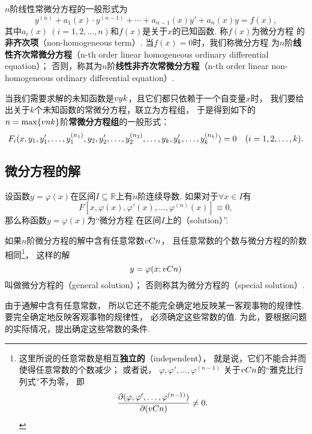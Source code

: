 \(n\)阶线性常微分方程的一般形式为
\begin{equation}\label{equation:微分方程.线性常微分方程的一般形式}
y^{(n)} + a_1(x) \cdot y^{(n-1)}
+ \dotsb + a_{n-1}(x) y'
+ a_n(x) y
= f(x),
\end{equation}
其中\(a_i(x)\ (i=1,2,\dotsc,n)\)和\(f(x)\)是关于\(x\)的已知函数.
称\(f(x)\)为微分方程  的\textbf{非齐次项}（non-homogeneous term）.
当\(f(x) = 0\)时，我们称微分方程  为\(n\)阶\textbf{线性齐次常微分方程}（n-th order linear homogeneous ordinary differential equation）；
否则，称其为\(n\)阶\textbf{线性非齐次常微分方程}（n-th order linear non-homogeneous ordinary differential equation）.

当我们需要求解的未知函数是\(v{y}{k}\)，且它们都只依赖于一个自变量\(x\)时，%
我们要给出关于\(k\)个未知函数的常微分方程，联立为方程组，%
于是得到如下的\(n = \max\{v{n}{k}\}\)阶\textbf{常微分方程组}的一般形式：
\[
\def\y#1{y_{#1},y_{#1}',\dotsc,y_{#1}^{(n_#1)}}%
F_i(x,\y{1},\y{2},\dotsc,\y{k})=0
\quad(i=1,2,\dotsc,k).
\]

\subsection{微分方程的解}
\begin{definition}
设函数\(y=\varphi(x)\)在区间\(I\subseteq\mathbb{R}\)上有\(n\)阶连续导数.
如果对于\(\forall x \in I\)有\[
F[x,\varphi(x),\varphi'(x),\dotsc,\varphi^{(n)}(x)]\equiv0,
\]那么称函数\(y=\varphi(x)\)为“微分方程  在区间\(I\)上的（solution）”.

如果\(n\)阶微分方程的解中含有任意常数\(v{C}{n}\)，%
且任意常数的个数与微分方程的阶数相同\footnote{%
这里所说的任意常数是相互\textbf{独立的}（independent），%
就是说，它们不能合并而使得任意常数的个数减少；%
或者说，%
\(\varphi,\varphi',\dotsc,\varphi^{(n-1)}\)%
关于\(v{C}{n}\)的“雅克比行列式”不为零，%
即\[
\pdv{ (\varphi,\varphi',\dotsc,\varphi^{(n-1)}) }{ (v{C}{n}) } \neq 0.
\]}，%
这样的解\[
y = \varphi(x;v{C}{n})
\]叫做微分方程的（general solution）；
否则称其为微分方程的（special solution）.
\end{definition}

由于通解中含有任意常数，%
所以它还不能完全确定地反映某一客观事物的规律性.
要完全确定地反映客观事物的规律性，%
必须确定这些常数的值.
为此，要根据问题的实际情况，提出确定这些常数的条件.


